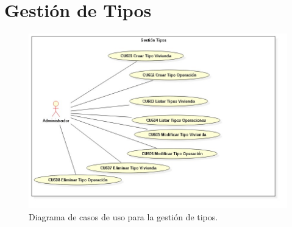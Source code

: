 \section{Gesti\'{o}n de Tipos}

\begin{figure}[h]
\centering
\includegraphics[width=1\textwidth]{Img/CasosDeUso/DCU06.jpg}
\caption{Diagrama de casos de uso para la gesti\'{o}n de tipos.}
\label{fig:dcu}
\end{figure}
